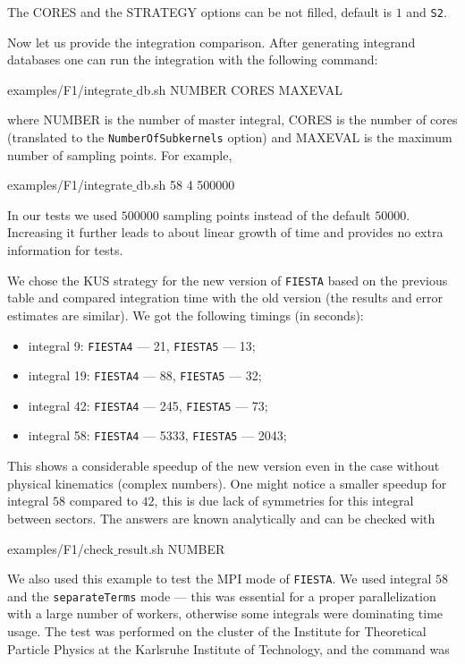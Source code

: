 \documentclass[preprint,12pt]{elsarticle}
\newenvironment{code}
  {\tt\noindent\begin{framed}\begin{flushleft}}
  {\end{flushleft}\end{framed}\normalfont}
\begin{document}
The CORES and the STRATEGY options can be not filled, default is $1$ and {\tt S2}. 

Now let us provide the integration comparison. After generating integrand databases one can run the integration with the following command:

\begin{code}
 examples/F1/integrate$\_$db.sh NUMBER CORES MAXEVAL
\end{code}

\noindent where NUMBER is the number of master integral, CORES is the number of cores (translated to the {\tt NumberOfSubkernels} option) and MAXEVAL is the maximum number of sampling points. For example,

\begin{code}
 examples/F1/integrate$\_$db.sh 58 4 500000
\end{code}

In our tests we used $500000$ sampling points instead of the default $50000$. Increasing it further leads to about linear growth of time and provides no extra information for tests.

We chose the KUS strategy for the new version of {\tt FIESTA} based on the previous table and compared integration time with the old version (the results and error estimates are similar). We got the following timings (in seconds):

\begin{itemize}
 \item integral 9: {\tt FIESTA4} --- 21, {\tt FIESTA5} --- 13;
 \item integral 19: {\tt FIESTA4} --- 88, {\tt FIESTA5} --- 32;
 \item integral 42: {\tt FIESTA4} --- 245, {\tt FIESTA5} --- 73;
 \item integral 58: {\tt FIESTA4} --- 5333, {\tt FIESTA5} --- 2043;
\end{itemize}

This shows a considerable speedup of the new version even in the case without physical kinematics (complex numbers). One might notice a smaller speedup for integral $58$ compared to $42$, this is due lack of symmetries for this integral between sectors. The answers are known analytically and can be checked with

\begin{code}
 examples/F1/check$\_$result.sh NUMBER
\end{code}

We also used this example to test the MPI mode of {\tt FIESTA}. We used integral $58$ and the {\tt separateTerms} mode --- this was essential for a proper parallelization with a large number of workers, otherwise some integrals were dominating time usage. The test was performed on the cluster of the Institute for Theoretical Particle Physics at the Karlsruhe Institute of Technology, and the command was
\end{document}
